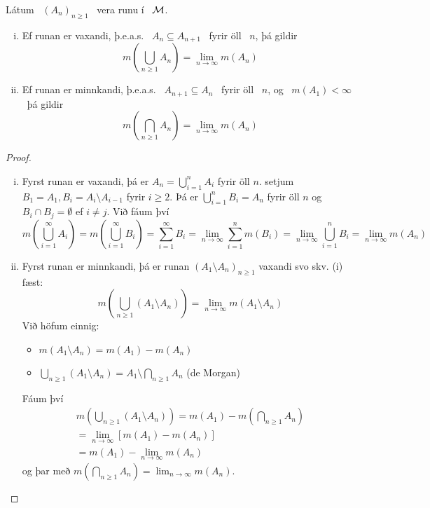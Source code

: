 \documentclass[12pt]{report}
\newcommand{\M}{{\cal M}}
\begin{document}
    \begin{setn*}
    
Látum  \ $(A_n)_{n\geq 1}$ \ vera runu í \ $\M$. 
\begin{enumerate}[(i)]
\medskip
\item
Ef runan er vaxandi, þ.e.a.s. \ $A_n\subseteq A_{n+1}$ \ fyrir öll \ $n$, þá gildir
\[
m\left(\bigcup_{n\geq 1}A_n\right) = \lim_{n\to\infty}m(A_n)
\]
\item
Ef runan er minnkandi, þ.e.a.s. \ $A_{n+1}\subseteq A_n$ \ fyrir öll \ $n$, og \ $m(A_1) < \infty$ \ þá gildir
\[
m\left(\bigcap_{n\geq 1}A_n\right) = \lim_{n\to\infty}m(A_n)
\]
\end{enumerate}
    \end{setn*}
    \begin{proof}
      \begin{enumerate}[(i)]
      \item Fyrst runan er vaxandi, þá er
        $A_n = \bigcup_{i=1}^{n} A_i$ fyrir öll $n$. setjum
        $B_1 = A_1, B_i = A_i \setminus A_{i-1}$ fyrir
        $i \geq 2$.  Þá er $\bigcup_{i=1}^n B_i = A_n$ fyrir
        öll $n$ og $B_i \cap B_j = \emptyset$ ef $i \neq
        j$. Við fáum því
        \[ m(\bigcup_{i=1}^{\infty} A_i) =
        m(\bigcup_{i=1}^{\infty} B_i) = \sum_{i=1}^{\infty}
        B_i = \lim_{n \to \infty} \sum_{i =1}^n m(B_i) =
        \lim_{n \to \infty} \bigcup_{i=1}^n B_i = \lim_{n \to
          \infty} m(A_n)\]

      \item Fyrst runan er minnkandi, þá er runan
        $(A_1 \setminus A_n)_{n \geq 1}$ vaxandi svo skv. (i)
        fæst:
        \[m(\bigcup_{n\geq 1} (A_1 \setminus A_n)) = \lim_{n
          \to \infty} m(A_1 \setminus A_n)\] Við höfum einnig:
        \begin{itemize}
        \item $m(A_1 \setminus A_n) = m(A_1) - m(A_n)$
        \item
          $\bigcup_{n \geq 1} (A_1 \setminus A_n) = A_1
          \setminus \bigcap_{n \geq 1} A_n$ (de Morgan)
        \end{itemize}
        Fáum því
        \begin{gather*}
          m(\bigcup_{n \geq 1} (A_1 \setminus A_n))
          = m(A_1) - m(\bigcap_{n \geq 1} A_n)\\
          = \lim_{n \to \infty} [m(A_1) - m(A_n)]\\
          = m(A_1) - \lim_{n \to \infty} m(A_n)
        \end{gather*}
        og þar með
        $m(\bigcap_{n \geq 1} A_n) = \lim_{n \to \infty}
        m(A_n)$.
      \end{enumerate}
    \end{proof}
\end{document}
